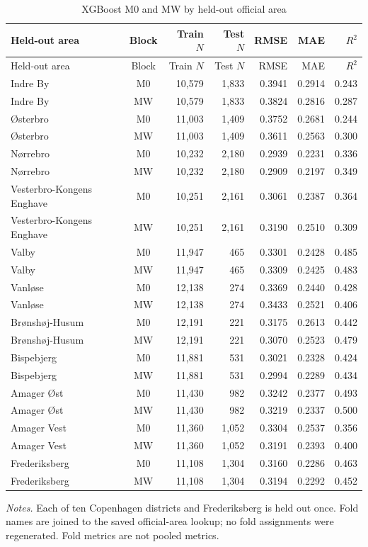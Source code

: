 \begin{landscape}
\small
\begin{longtable}{>{\raggedright\arraybackslash}p{6cm}crrrrr}
\caption{XGBoost M0 and MW by held-out official area}\label{tab:app-geographic-folds}\\
\toprule
Held-out area & Block & Train $N$ & Test $N$ & RMSE & MAE & $R^2$ \\
\midrule
\endfirsthead
\toprule
Held-out area & Block & Train $N$ & Test $N$ & RMSE & MAE & $R^2$ \\
\midrule
\endhead
Indre By & M0 & 10,579 & 1,833 & 0.3941 & 0.2914 & 0.243 \\
Indre By & MW & 10,579 & 1,833 & 0.3824 & 0.2816 & 0.287 \\
Østerbro & M0 & 11,003 & 1,409 & 0.3752 & 0.2681 & 0.244 \\
Østerbro & MW & 11,003 & 1,409 & 0.3611 & 0.2563 & 0.300 \\
Nørrebro & M0 & 10,232 & 2,180 & 0.2939 & 0.2231 & 0.336 \\
Nørrebro & MW & 10,232 & 2,180 & 0.2909 & 0.2197 & 0.349 \\
Vesterbro-Kongens Enghave & M0 & 10,251 & 2,161 & 0.3061 & 0.2387 & 0.364 \\
Vesterbro-Kongens Enghave & MW & 10,251 & 2,161 & 0.3190 & 0.2510 & 0.309 \\
Valby & M0 & 11,947 & 465 & 0.3301 & 0.2428 & 0.485 \\
Valby & MW & 11,947 & 465 & 0.3309 & 0.2425 & 0.483 \\
Vanløse & M0 & 12,138 & 274 & 0.3369 & 0.2440 & 0.428 \\
Vanløse & MW & 12,138 & 274 & 0.3433 & 0.2521 & 0.406 \\
Brønshøj-Husum & M0 & 12,191 & 221 & 0.3175 & 0.2613 & 0.442 \\
Brønshøj-Husum & MW & 12,191 & 221 & 0.3070 & 0.2523 & 0.479 \\
Bispebjerg & M0 & 11,881 & 531 & 0.3021 & 0.2328 & 0.424 \\
Bispebjerg & MW & 11,881 & 531 & 0.2994 & 0.2289 & 0.434 \\
Amager Øst & M0 & 11,430 & 982 & 0.3242 & 0.2377 & 0.493 \\
Amager Øst & MW & 11,430 & 982 & 0.3219 & 0.2337 & 0.500 \\
Amager Vest & M0 & 11,360 & 1,052 & 0.3304 & 0.2537 & 0.356 \\
Amager Vest & MW & 11,360 & 1,052 & 0.3191 & 0.2393 & 0.400 \\
Frederiksberg & M0 & 11,108 & 1,304 & 0.3160 & 0.2286 & 0.463 \\
Frederiksberg & MW & 11,108 & 1,304 & 0.3194 & 0.2292 & 0.452 \\
\bottomrule
\end{longtable}
{\footnotesize\noindent\emph{Notes.} Each of ten Copenhagen districts and Frederiksberg is held out once. Fold names are joined to the saved official-area lookup; no fold assignments were regenerated. Fold metrics are not pooled metrics.\par}
\end{landscape}
